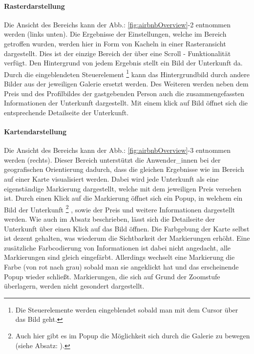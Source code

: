 \documentclass[../Bachelorarbeit.tex]{subfiles}
\begin{document}
\paragraph{Rasterdarstellung}
\label{airbnb:gridview}
Die Ansicht des Bereichs  kann der Abb.: \ref{fig:airbnbOverview}-2 entnommen werden (links unten).
Die Ergebnisse der Einstellungen, welche im Bereich  getroffen wurden, werden hier in Form von Kacheln in einer Rasteransicht dargestellt.
Dies ist der einzige Bereich der über eine Scroll - Funktionalität verfügt.
Den Hintergrund von jedem Ergebnis stellt ein Bild der Unterkunft da. 
Durch die eingeblendeten Steuerelement
	\footnote{Die Steuerelemente werden eingeblendet sobald man mit dem Cursor über das Bild geht.} 
kann das Hintergrundbild durch andere Bilder aus der jeweiligen Galerie ersetzt werden. 
Des Weiteren werden neben dem Preis und des Profilbildes der gastgebenden Person auch die zusammengefassten Informationen der Unterkunft dargestellt. 
Mit einem klick auf Bild öffnet sich die entsprechende Detailseite der Unterkunft. 

\paragraph{Kartendarstellung}
\label{airbnb:map}
Die Ansicht des Bereichs  kann der Abb.: \ref{fig:airbnbOverview}-3 entnommen werden (rechts).
Dieser Bereich unterstützt die Anwender\_innen bei der geografischen Orientierung dadurch, dass die gleichen Ergebnisse wie im Bereich  auf einer Karte visualisiert werden.
Dabei wird jede Unterkunft als eine eigenständige Markierung dargestellt, welche mit dem jeweiligen Preis versehen ist.
Durch einen Klick auf die Markierung öffnet sich ein Popup, in welchem ein Bild der Unterkunft
\footnote{
	Auch hier gibt es im Popup die Möglichkeit sich durch die Galerie zu bewegen (siehe Absatz: ).
	} 
, sowie der Preis und weitere Informationen dargestellt werden. 
Wie auch im Absatz  beschrieben, lässt sich die Detailseite der Unterkunft über einen Klick auf das Bild öffnen.
Die Farbgebung der Karte selbst ist dezent gehalten, was wiederum die Sichtbarkeit der Markierungen erhöht.
Eine zusätzliche Farbcodierung von Informationen ist dabei nicht angedacht, alle Markierungen sind gleich eingefärbt.
Allerdings wechselt eine Markierung die Farbe (von rot nach grau) sobald man sie  angeklickt hat und das erscheinende Popup wieder schließt.
Markierungen, die sich auf Grund der Zoomstufe überlagern, werden nicht gesondert dargestellt.
\end{document}
